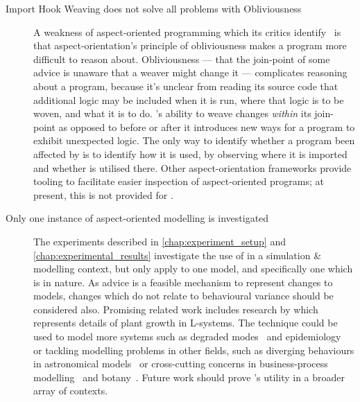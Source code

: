 \begin{description}

  \item[Import Hook Weaving does not solve all problems with Obliviousness]
    A weakness of aspect-oriented programming which its critics
    identify~\cite{steimann06paradoxical,Constantinides04aopconsidered,przybylek2010wrong}
    is that aspect-orientation's principle of obliviousness makes a program more
    difficult to reason about. Obliviousness --- that the join-point of some
    advice is unaware that a weaver might change it --- complicates reasoning
    about a program, because it's unclear from reading its source code that
    additional logic may be included when it is run, where that logic is to be
    woven, and what it is to do. \pdsfthree{}'s ability to weave changes
    \emph{within} its join-point as opposed to before or after it introduces new
    ways for a program to exhibit unexpected logic. The only way to identify
    whether a program been affected by \pdsfthree{} is to identify how it is used, by
    observing where it is imported and whether \pdsfthree{} is utilised there. Other
    aspect-orientation frameworks provide tooling to facilitate easier
    inspection of aspect-oriented programs; at present, this is not provided for
    \pdsfthree{}.

  \item[Only one instance of aspect-oriented modelling is investigated]
    The experiments described in \cref{chap:experiment_setup} and
    \cref{chap:experimental_results} investigate the use of \aop{} in a
    simulation \& modelling context, but only apply \aspectorientation{} to one
    model, and specifically one which is \sociotechnical{} in nature. As advice
    is a feasible mechanism to represent changes to models, changes which do not
    relate to behavioural variance should be considered also. Promising related
    work includes research by \citet{Cieslak_2011} which represents details of
    plant growth in \aspectoriented{} L-systems. The technique could be used to
    model more \sociotechnical{} systems such as degraded
    modes~\cite{johnson2007degradedmodes} and
    epidemiology~\cite{aranTheatreThesis} or tackling modelling problems in
    other fields, such as diverging behaviours in astronomical
    models~\cite{comparison_of_galaxy_formation_models,comparison_of_radiative_models_of_galaxies}
    or cross-cutting concerns in business-process
    modelling~\cite{Cappelli_AOBPM,da2020implementation} and
    botany~\cite{Cieslak_2011}. Future work should prove \aop{}'s utility in
    a broader array of contexts.


\end{description}
